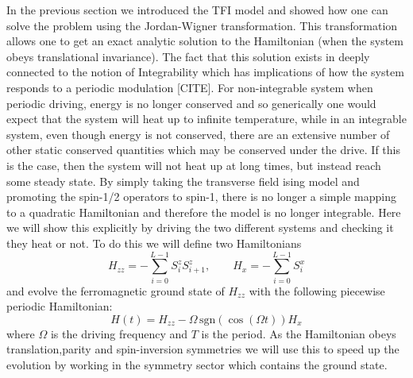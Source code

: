 \documentclass{SciPost}
\newcommand\0{\scalebox{-1}[1]{0}}
\begin{document}
 In the previous section we introduced the TFI model and showed how one can solve the problem using the Jordan-Wigner transformation. This transformation allows one to get an exact analytic solution to the Hamiltonian (when the system obeys translational invariance). The fact that this solution exists in deeply connected to the notion of Integrability which has implications of how the system responds to a periodic modulation [CITE]. For non-integrable system when periodic driving, energy is no longer conserved and so generically one would expect that the system will heat up to infinite temperature, while in an integrable system, even though energy is not conserved, there are an extensive number of other static conserved quantities which may be conserved under the drive. If this is the case, then the system will not heat up at long times, but instead reach some steady state. By simply taking the transverse field ising model and promoting the spin-1/2 operators to spin-1, there is no longer a simple mapping to a quadratic Hamiltonian and therefore the model is no longer integrable. Here we will show this explicitly by driving the two different systems and checking it they heat or not. To do this we will define two Hamiltonians
\begin{equation}
H_{zz} = -\sum_{i=0}^{L-1} S^z_iS^z_{i+1}, \qquad H_{x} = -\sum_{i=0}^{L-1}S^x_i
\end{equation}
and evolve the ferromagnetic ground state of $H_{zz}$ with the following piecewise periodic Hamiltonian:
\begin{equation}
H(t)=H_{zz} -\Omega\,\mathrm{sgn}\left(\cos(\Omega t)\right)H_x
\end{equation}
where $\Omega$ is the driving frequency and $T$ is the period. As the Hamiltonian obeys translation,parity and spin-inversion symmetries we will use this to speed up the evolution by working in the symmetry sector which contains the ground state. 
\end{document}
